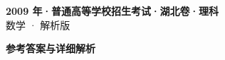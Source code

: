 \documentclass[zihao=-4, a4paper]{ctexart}
\begin{document}
\begin{center}
  {\Large\bfseries 2009 年·普通高等学校招生考试·湖北卷·理科}\\[4pt]
  {\large 数学 · 解析版}
\end{center}
\medskip
{}

\clearpage
{}
\begin{center}{\Large\bfseries 参考答案与详细解析}\end{center}
\medskip

\end{document}
